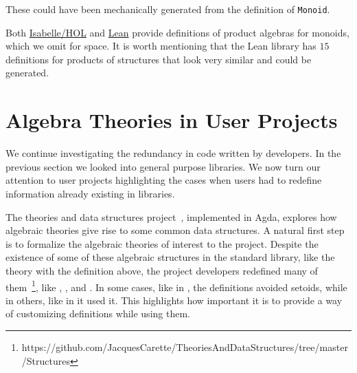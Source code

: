 These could have been mechanically generated from the definition
of \verb|Monoid|.

Both 
\href{https://isabelle.in.tum.de/website-Isabelle2019/dist/library/HOL/HOL-Algebra/Group.html}
{Isabelle/HOL}
and 
\href{https://github.com/leanprover-community/mathlib/blob/3c58f160fd51ebf989138ed7c8981f821f08f860/src/algebra/pi_instances.lean}
{Lean}
provide definitions of product algebras for monoids, which we omit for space.
It is worth mentioning that the Lean library has $15$ definitions for products
of structures that look very similar and could be generated. 


\section{Algebra Theories in User Projects}
\label{sec:redun:user_projects}

We continue investigating the redundancy in code written by developers. In the previous section we looked into general purpose libraries. We now turn our attention to user projects highlighting the cases when users had to redefine information already existing in libraries. 

The theories and data structures project~\cite{theoriesAndDts}, implemented in Agda, explores how algebraic theories give rise to some common data structures. A natural first step is to formalize the algebraic theories of interest to the project. Despite the existence of some of these algebraic structures in the standard library, like the  theory with the definition above, the project developers redefined many of them~\footnote{https://github.com/JacquesCarette/TheoriesAndDataStructures/tree/master/Structures}, like , , and . In some cases, like in , the definitions avoided setoids, while in others, like in  it used it. This highlights how important it is to provide a way of customizing definitions while using them. 

